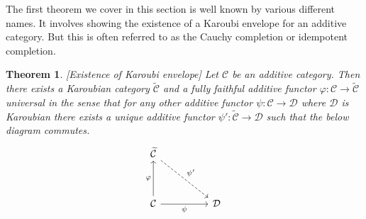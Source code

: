 \documentclass[12pt]{report}
\numberwithin{equation}{section}
\newtheorem{theorem}[dummy]{Theorem}
\begin{document}
	The first theorem we cover in this section is well known by various different names. It involves showing the existence of a Karoubi envelope for an additive category. But this is often referred to as the Cauchy completion or idempotent completion.
	\begin{theorem}\label{thm:pseudoabelian}[Existence of Karoubi envelope]
		Let $\mathcal{C}$ be an additive category. Then there exists a Karoubian category $\widetilde{\mathcal{C}}$ and a fully faithful additive functor $\varphi:\mathcal{C} \to \widetilde{\mathcal{C}}$ universal in the sense that for any other additive functor $\psi: \mathcal{C} \to \mathcal{D}$ where $\mathcal{D}$ is Karoubian there exists a unique additive functor ${\psi'}: \widetilde{\mathcal{C}} \to \mathcal{D} $ such that the below diagram commutes.
		\[\begin{tikzcd}
			{\widetilde{\mathcal{C}}} \\
			\\
			{\mathcal{C}} && {\mathcal{D}}
			\arrow["{\psi'}",dashed, from=1-1, to=3-3]
			\arrow["\varphi", from=3-1, to=1-1]
			\arrow["\psi"',from=3-1, to=3-3]
		\end{tikzcd}\]
	\end{theorem}
\end{document}
